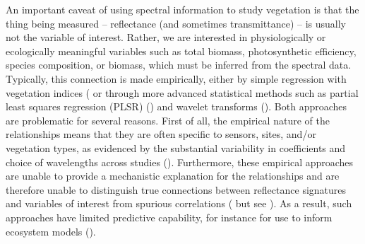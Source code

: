     An important caveat of using spectral information to study vegetation is
    that the thing being measured -- reflectance (and sometimes transmittance)
    -- is usually not the variable of interest. Rather, we are interested in
    physiologically or ecologically meaningful variables such as total biomass,
    photosynthetic efficiency, species composition, or biomass, which must be
    inferred from the spectral data. Typically, this connection is made
% 
% 
%
%
    empirically, either by simple regression with vegetation indices
    (\cite{Haboudane2002, Huete2002, LeMaire2004, Liu2012a, Fassnacht2015} or
    through more advanced statistical methods such as partial least squares
    regression (PLSR) (\cite{Serbin2012, Couture2013, Serbin2013a}) and wavelet
    transforms (\cite{Blackburn2008, Cheng2010, Banskota2013b}).  Both
    approaches are problematic for several reasons.  First of all, the
    empirical nature of the relationships means that they are often specific to
    sensors, sites, and/or vegetation types, as evidenced by the substantial
    variability in coefficients and choice of wavelengths across studies
    (\cite{Leprieur1994, Knyazikhin1998, Myneni2002, Huete2002, Liu2012a,
    Wessels2012, Croft2014}). Furthermore, these empirical approaches are
    unable to provide a mechanistic explanation for the relationships and are
    therefore unable to distinguish true connections between reflectance
    signatures and variables of interest from spurious correlations
    (\cite{Knyazikhin2013} but see \cite{Townsend2013}). As a result, such
    approaches have limited predictive capability, for instance for use to
    inform ecosystem models (\cite{Quaife2008}). 

